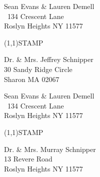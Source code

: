 \documentclass[12pt]{article}
\begin{document}
\begin{minipage}{.5\linewidth} \noindent
Sean Evans \& Lauren Demell\\\ 
134 Crescent Lane\\ 
Roslyn Heights NY 11577
\end{minipage}
\begin{minipage}{.5\linewidth \hspace{-.2in} \vspace{-.3in}}
\begin{flushright}
\framebox(1,1){STAMP}
\end{flushright}
\end{minipage}

\begin{center} \begin{Huge} \vspace*{\fill}
Dr. \& Mrs. Jeffrey Schnipper\\
30 Sandy Ridge Circle\\
Sharon MA 02067\\
\vspace{\fill} \end{Huge} \end{center}

\clearpage

\begin{minipage}{.5\linewidth} \noindent
Sean Evans \& Lauren Demell\\\ 
134 Crescent Lane\\ 
Roslyn Heights NY 11577
\end{minipage}
\begin{minipage}{.5\linewidth \hspace{-.2in} \vspace{-.3in}}
\begin{flushright}
\framebox(1,1){STAMP}
\end{flushright}
\end{minipage}

\begin{center} \begin{Huge} \vspace*{\fill}
Dr. \& Mrs. Murray Schnipper\\
13 Revere Road\\
Roslyn Heights NY 11577\\
\vspace{\fill} \end{Huge} \end{center}

\clearpage
\end{document}
